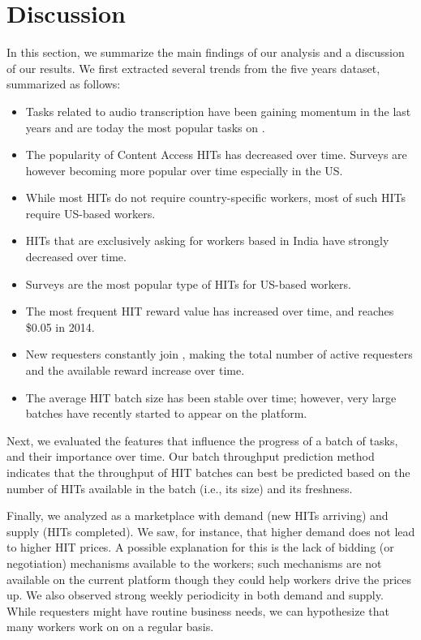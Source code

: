 \section{Discussion}
\label{sec:discuss}

In this section, we summarize the main findings of our analysis and a discussion of our results. We first extracted several trends from the five years dataset, summarized as follows:
\begin{itemize}[noitemsep,topsep=0pt,parsep=0pt,partopsep=0pt]
	\item Tasks related to audio transcription have been gaining momentum in the last years and are today the most popular tasks on \amt{}.
	\item The popularity of Content Access HITs has decreased over time. Surveys are however becoming more popular over time especially in the US.
	\item While most HITs do not require country-specific workers, most of such HITs require US-based workers.
	\item HITs that are exclusively asking for workers based in India have strongly decreased over time.
	\item Surveys are the most popular type of HITs for US-based workers.
	\item The most frequent HIT reward value has increased over time, and reaches \$0.05 in 2014.
	\item New requesters constantly join \amt{}, making the total number of active requesters and the available reward increase over time.
	\item The average HIT batch size has been stable over time; however, very large batches have recently started to appear on the platform.
\end{itemize}

Next, we evaluated the features that influence the progress of a batch of tasks, and their importance over time. Our batch throughput prediction method indicates that the throughput of HIT batches can best be predicted based on the number of HITs available in the batch (i.e., its size) and its freshness.

Finally, we analyzed \amt{} as a marketplace with demand (new HITs arriving) and supply (HITs completed). We saw, for instance, that higher demand does not lead to higher HIT prices. A possible explanation for this is the lack of bidding (or negotiation) mechanisms available to the workers; such mechanisms are not available on the current platform though they could help workers drive the prices up. We also observed strong weekly periodicity in both demand and supply. While requesters might have routine business needs, we can hypothesize that many workers work on \amt{} on a regular basis.